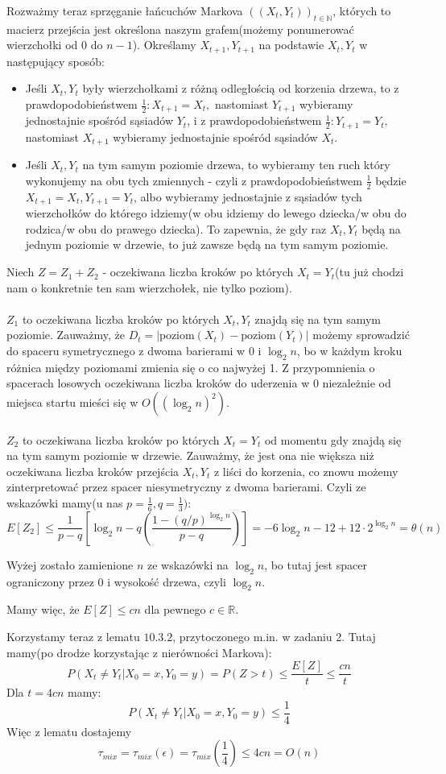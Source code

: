 Rozważmy teraz sprzęganie łańcuchów Markova \(((X_t, Y_t))_{t\in \mathbb{N}}\), których to macierz przejścia jest określona naszym grafem(możemy ponumerować wierzchołki od \(0\) do \(n-1\)). Określamy \(X_{t+1}, Y_{t+1}\) na podstawie \(X_t, Y_t\) w następujący sposób:
\begin{itemize}
	\item Jeśli \(X_t, Y_t\) były wierzchołkami z różną odległością od korzenia drzewa, to z prawdopodobieństwem \(\frac{1}{2} : X_{t+1} = X_t, \) nastomiast \(Y_{t+1}\) wybieramy jednostajnie spośród sąsiadów \(Y_t\), i z prawdopodobieństwem \(\frac{1}{2}:Y_{t+1} = Y_t, \) nastomiast \(X_{t+1}\) wybieramy jednostajnie spośród sąsiadów \(X_t\).
	\item Jeśli \(X_t, Y_t\) na tym samym poziomie drzewa, to wybieramy ten ruch który wykonujemy na obu tych zmiennych - czyli z prawdopodobieństwem \(\frac{1}{2}\) będzie \(X_{t+1} = X_t, Y_{t+1}=Y_t\), albo wybieramy jednostajnie z sąsiadów tych wierzchołków do którego idziemy(w obu idziemy do lewego dziecka/w obu do rodzica/w obu do prawego dziecka). To zapewnia, że gdy raz \(X_t, Y_t\) będą na jednym poziomie w drzewie, to już zawsze będą na tym samym poziomie.
\end{itemize}
Niech \(Z = Z_1+Z_2\) - oczekiwana liczba kroków po których \(X_t = Y_t\)(tu już chodzi nam o konkretnie ten sam wierzchołek, nie tylko poziom). \\
\\
\(Z_1\) to oczekiwana liczba kroków po których \(X_t, Y_t\) znajdą się na tym samym poziomie. Zauważmy, że \(D_t = |\text{poziom}(X_t)-\text{poziom}(Y_t)|\) możemy sprowadzić do spaceru symetrycznego z dwoma barierami w \(0\) i \(\log_2n\), bo w każdym kroku różnica między poziomami zmienia się o co najwyżej 1. Z przypomnienia o spacerach losowych oczekiwana liczba kroków do uderzenia w 0 niezależnie od miejsca startu mieści się w \(O((\log_2n)^2)\).\\
\\
\(Z_2\) to oczekiwana liczba kroków po których \(X_t = Y_t\) od momentu gdy znajdą się na tym samym poziomie w drzewie. Zauważmy, że jest ona nie większa niż oczekiwana liczba kroków przejścia \(X_t, Y_t\) z liści do korzenia, co znowu możemy zinterpretować przez spacer niesymetryczny z dwoma barierami. Czyli ze wskazówki mamy(u nas \(p = \frac{1}{6}, q=\frac{1}{3})\):
\[
	E[Z_2] \leq \frac{1}{p-q}\left[\log_2n-q\left(\frac{1-(q/p)^{\log_2n}}{p-q}\right)\right] = -6\log_2n - 12 + 12 \cdot 2^{\log_2n} = \theta(n)
\]

Wyżej zostało zamienione \(n\) ze wskazówki na \(\log_2n\), bo tutaj jest spacer ograniczony przez 0 i wysokość drzewa, czyli \(\log_2n\).

Mamy więc, że \(E[Z] \leq cn\) dla pewnego \(c \in \mathbb{R}\).

Korzystamy teraz z lematu \(10.3.2\), przytoczonego m.in. w zadaniu 2. Tutaj mamy(po drodze korzystając z nierówności Markova):
\[
	P(X_t \neq Y_t | X_0 = x, Y_0 = y) = P(Z > t) \leq \frac{E[Z]}{t} \leq \frac{cn}{t}
\]
Dla \(t = 4cn\) mamy:
\[
	P(X_t \neq Y_t | X_0 = x, Y_0 = y) \leq \frac{1}{4}
\]
Więc z lematu dostajemy
\[
	\tau_{mix} = \tau_{mix}(\epsilon) = \tau_{mix}(\frac{1}{4}) \leq 4cn = O(n)
\]

